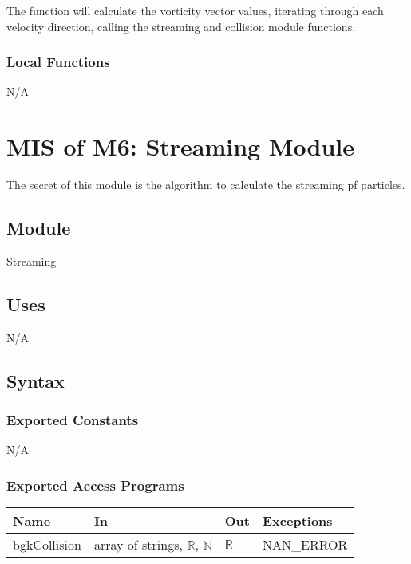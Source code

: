 \documentclass[12pt, titlepage]{article}
\begin{document}
The function will calculate the vorticity vector values, iterating through each velocity direction, calling the streaming and collision module functions.

\subsubsection{Local Functions}

N/A

\newpage

\section{MIS of M6: Streaming Module} \label{STModule}

The secret of this module is the algorithm to calculate the streaming pf particles.

\subsection{Module}

Streaming

\subsection{Uses}
N/A
\subsection{Syntax}

\subsubsection{Exported Constants}
N/A

\subsubsection{Exported Access Programs}

\begin{center}
	\begin{tabular}{p{2cm} p{4cm} p{4cm} p{2cm}}
		\hline
		\textbf{Name} & \textbf{In} & \textbf{Out} & \textbf{Exceptions} \\
		\hline
		bgkCollision & array of strings, $\mathbb{R}$, $\mathbb{N}$ & $\mathbb{R}$ & NAN\_ERROR \\
		\hline
	\end{tabular}
\end{center}
\end{document}
